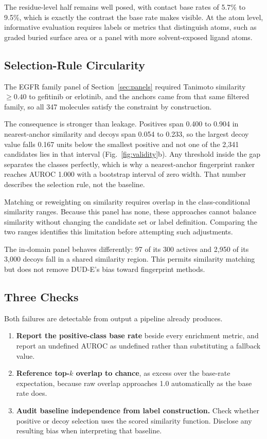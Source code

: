 \documentclass{ieeeaccess}
\begin{document}
The residue-level half remains well posed, with contact base rates of 5.7\% to
9.5\%, which is exactly the contrast the base rate makes visible. At the atom
level, informative evaluation requires labels or metrics that distinguish
atoms, such as graded buried surface area or a panel with more solvent-exposed
ligand atoms.

\subsection{Selection-Rule Circularity}
The EGFR family panel of Section~\ref{sec:panels} required Tanimoto similarity
$\geq 0.40$ to gefitinib or erlotinib, and the anchors came from that same
filtered family, so all 347 molecules satisfy the constraint by construction.

The consequence is stronger than leakage. Positives span 0.400 to 0.904 in
nearest-anchor similarity and decoys span 0.054 to 0.233, so the largest decoy
value falls 0.167 units below the smallest positive and not one of the 2{,}341
candidates lies in that interval (Fig.~\ref{fig:validity}b). Any threshold
inside the gap separates the classes perfectly, which is why a nearest-anchor
fingerprint ranker reaches AUROC 1.000 with a bootstrap interval of zero width.
That number describes the selection rule, not the baseline.

Matching or reweighting on similarity requires overlap in the class-conditional
similarity ranges. Because this panel has none, these approaches cannot balance
similarity without changing the candidate set or label definition. Comparing
the two ranges identifies this limitation before attempting such adjustments.

The in-domain panel behaves differently: 97 of its 300 actives and 2{,}950 of
its 3{,}000 decoys fall in a shared similarity region. This permits similarity
matching but does not remove DUD-E's bias toward fingerprint methods.

\subsection{Three Checks}
Both failures are detectable from output a pipeline already produces.

\begin{enumerate}
\item \textbf{Report the positive-class base rate} beside every enrichment
metric, and report an undefined AUROC as undefined rather than substituting a
fallback value.
\item \textbf{Reference top-$k$ overlap to chance}, as excess over the base-rate
expectation, because raw overlap approaches 1.0 automatically as the base rate
does.
\item \textbf{Audit baseline independence from label construction.} Check
whether positive or decoy selection uses the scored similarity function.
Disclose any resulting bias when interpreting that baseline.
\end{enumerate}
\end{document}
